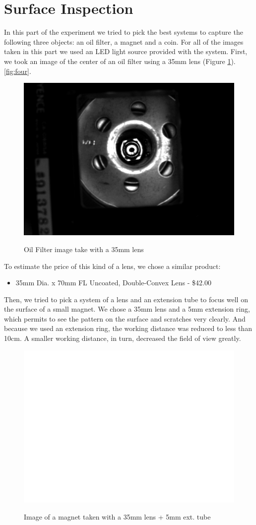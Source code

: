 \documentclass[english]{article}
\begin{document}
\section{Surface Inspection}
In this part of the experiment we tried to pick the best systems to capture the following three objects: an oil filter, a magnet and a coin.
For all of the images taken in this part we used an LED light source provided with the system.
First, we took an image of the center of an oil filter using a 35mm lens (Figure \ref{fig:seven}).
\ref{fig:four}.\\
\begin{figure}[H]
	\centering
	{\label{fig:}
	\includegraphics[width=0.6\linewidth]		{Pictures/bonus/oil_filter_adj.png}
	}
	\caption{Oil Filter image take with a 35mm lens}
	\label{fig:seven}
\end{figure}
To estimate the price of this kind of a lens, we chose a similar product:\\
\begin{itemize}
\item 35mm Dia. x 70mm FL Uncoated, Double-Convex Lens - \$42.00\\
\end{itemize}
Then, we tried to pick a system of a lens and an extension tube to focus well on the surface of a small magnet.
We chose a 35mm lens and a 5mm extension ring, which permits to see the pattern on the surface and scratches very clearly.
And because we used an extension ring, the working distance was reduced to less than 10cm. 
A smaller working distance, in turn, decreased the field of view greatly.
\begin{figure}[H]
	\centering
	{\label{fig:}
	\includegraphics[width=0.7\linewidth]		{Pictures/bonus/35+5.png}
	}
	\caption{Image of a magnet taken with a 35mm lens + 5mm ext. tube}
	\label{fig:eight}
\end{figure}
\end{document}
